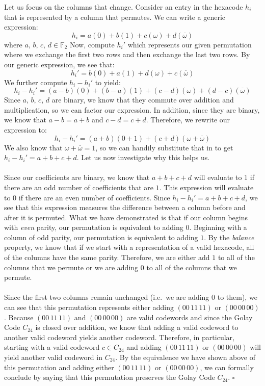 \documentclass[letterpaper]{article}
\newcommand*{\QED}{\hfill\ensuremath{\square}}%
\begin{document}
Let us focus on the columns that change.
Consider an entry in the hexacode $ h_i $ that is represented by a column that permutes.
We can write a generic expression:
\[
h_i = a(0) + b(1) + c(\omega) + d(\overline{\omega})
\]
where $ a, \, b, \, c, \, d \in \mathbb{F}_2 $
Now, compute $ h_i' $ which represents our given permutation where we exchange the first two rows and then exchange the last two rows.
By our generic expression, we see that:
\[
h_i' = b(0) + a(1) + d(\omega) + c(\overline{\omega})
\]
We further compute $ h_i - h_i' $ to yield:
\[
h_i - h_i' = (a - b)(0) + (b - a)(1) + (c - d)(\omega) + (d - c)(\overline{\omega})
\]
Since $ a, \, b, \, c, \, d $ are binary, we know that they commute over addition and multiplication, so we can factor our expression.
In addition, since they are binary, we know that $ a - b = a + b $ and $ c - d = c + d $.
Therefore, we rewrite our expression to:
\[
h_i - h_i' = (a + b)(0 + 1) + (c + d)(\omega + \overline{\omega})
\]
We also know that $ \omega + \overline{\omega} = 1 $, so we can handily substitute that in to get $ h_i - h_i' = a + b + c + d $.
Let us now investigate why this helps us.
\\ \\
Since our coefficients are binary, we know that $ a + b + c + d $ will evaluate to $ 1 $ if there are an odd number of coefficients that are $ 1 $.
This expression will evaluate to $ 0 $ if there are an even number of coefficients.
Since $ h_i - h_i' = a + b + c + d $, we see that this expression measures the difference between a column before and after it is permuted.
What we have demonstrated is that if our column begins with \textit{even} parity, our permutation is equivalent to adding $ 0 $.
Beginning with a column of odd parity, our permutation is equivalent to adding $ 1 $.
By the \textit{balance} property, we know that if we start with a representation of a valid hexacode, all of the columns have the same parity.
Therefore, we are either add $ 1 $ to all of the columns that we permute or we are adding $ 0 $ to all of the columns that we permute.
\\ \\
Since the first two columns remain unchanged (i.e.\ we are adding $ 0 $ to them), we can see that this permutation represents either adding $ (00 \, 11 \, 11) $ or $ (00 \, 00 \, 00) $.
Because $ (00 \, 11 \, 11) $ and $ (00 \, 00 \, 00) $ are valid codewords and since the Golay Code $ C_{24} $ is closed over addition, we know that adding a valid codeword to another valid codeword yields another codeword.
Therefore, in particular, starting with a valid codeword $ c \in C_{24} $ and adding $ (00 \, 11 \, 11) $ or $ (00 \, 00 \, 00) $ will yield another valid codeword in $ C_{24} $.
By the equivalence we have shown above of this permutation and adding either $ (00 \, 11 \, 11) $ or $ (00 \, 00 \, 00) $, we can formally conclude by saying that this permutation preserves the Golay Code $ C_{24} $.
\QED{}
\end{document}
